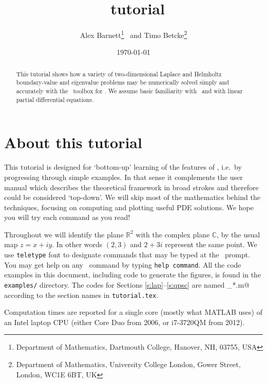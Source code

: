 \documentclass[11pt]{article}
\begin{document}
\title{\mpspack\ tutorial}
\author{Alex Barnett\footnote{Department of Mathematics, Dartmouth College,
Hanover, NH, 03755, USA}
\ and
Timo Betcke\footnote{Department of Mathematics,
University College London, Gower Street, London, WC1E 6BT, UK}}

\date{\today}   %

\maketitle
\begin{abstract}
This tutorial shows how a variety of two-dimensional Laplace and Helmholtz
boundary-value and eigenvalue problems
may be numerically solved simply and accurately with the \mpspack\ toolbox
for \matlab. We assume basic familiarity with \matlab\
and with linear partial differential equations.
\end{abstract}

\setcounter{tocdepth}{2}
\tableofcontents

\section{About this tutorial}

This tutorial is designed for `bottom-up' learning of the features
of \mpspack, i.e.\ by progressing through simple examples.
In that sense it complements the user manual which describes
the theoretical framework in broad strokes and therefore could
be considered `top-down'.
We will skip most of the mathematics behind the techniques,
focusing on computing and plotting useful PDE solutions.
We hope you will try each command as you read!

Throughout we will identify the plane $\mathbb{R}^2$ with the complex
plane $\mathbb{C}$, by the usual map $z=x+iy$. In other words
$(2,3)$ and $2+3i$ represent the same point.
We use {\tt teletype} font to designate commands that may be typed
at the \matlab\ prompt.
You may get help on any \mpspack\ command by typing {\tt help command}.
All the code examples in this document, including code to generate the
figures, is found in the {\tt examples/} directory.
The codes for Sections \ref{s:lap}--\ref{s:qpsc} are named
\verb@tut_*.m@ according to the section names in {\tt tutorial.tex}.

Computation times are reported for a single core (mostly what MATLAB
uses) of an Intel laptop CPU (either Core Duo from 2006, or i7-3720QM
from 2012).











 

\end{document}
